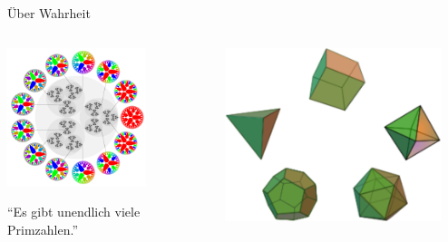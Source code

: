 \documentclass[12pt,compress,ngerman,utf8,t]{beamer}
\begin{document}
\begin{frame}{Über Wahrheit}
  \vspace*{-0.5em}
  \begin{columns}[t]
    \begin{column}{0.32\textwidth}
      \centering\includegraphics[width=0.7\textwidth]{p-adic-numbers}
      \medskip

      "`Es gibt unendlich viele Primzahlen."'
    \end{column}
    \begin{column}{0.32\textwidth}
      \centering\includegraphics[width=0.9\textwidth]{platonic-solids}
      \medskip


\end{column}
\end{columns}
\end{frame}
\end{document}
